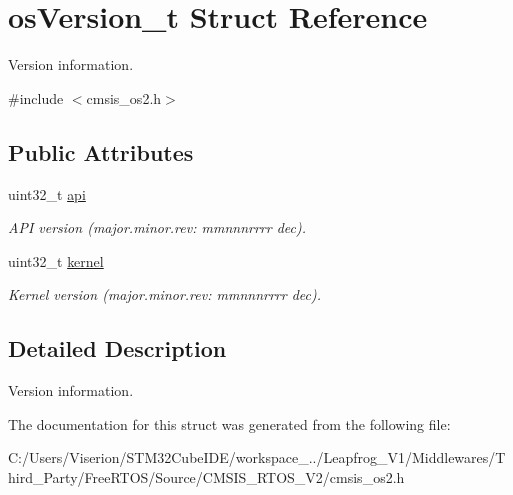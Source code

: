 \hypertarget{structos_version__t}{}\section{os\+Version\+\_\+t Struct Reference}
\label{structos_version__t}


Version information.  




{\ttfamily \#include $<$cmsis\+\_\+os2.\+h$>$}

\subsection*{Public Attributes}
\begin{DoxyCompactItemize}
\item 
\mbox{\label{structos_version__t_a399e0292985f12145a0e61c0b50a50ec}} 
uint32\+\_\+t \mbox{\hyperlink{structos_version__t_a399e0292985f12145a0e61c0b50a50ec}{api}}
\begin{DoxyCompactList}\small\item\em A\+PI version (major.\+minor.\+rev\+: mmnnnrrrr dec). \end{DoxyCompactList}\item 
\mbox{\label{structos_version__t_a3a589e0cc665071abb720afda12e9a15}} 
uint32\+\_\+t \mbox{\hyperlink{structos_version__t_a3a589e0cc665071abb720afda12e9a15}{kernel}}
\begin{DoxyCompactList}\small\item\em Kernel version (major.\+minor.\+rev\+: mmnnnrrrr dec). \end{DoxyCompactList}\end{DoxyCompactItemize}


\subsection{Detailed Description}
Version information. 

The documentation for this struct was generated from the following file\+:\begin{DoxyCompactItemize}
\item 
C\+:/\+Users/\+Viserion/\+S\+T\+M32\+Cube\+I\+D\+E/workspace\+\_../\+Leapfrog\+\_\+\+V1/\+Middlewares/\+Third\+\_\+\+Party/\+Free\+R\+T\+O\+S/\+Source/\+C\+M\+S\+I\+S\+\_\+\+R\+T\+O\+S\+\_\+\+V2/cmsis\+\_\+os2.\+h\end{DoxyCompactItemize}
